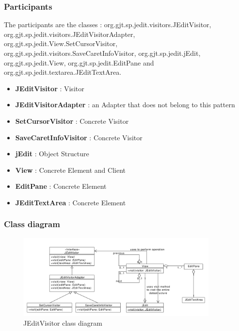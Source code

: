 \documentclass[a4paper,10pt]{article}
\begin{document}
\subsubsection{Participants}
The participants are the classes : org.gjt.sp.jedit.visitors.JEditVisitor, org.gjt.sp.jedit.visitors.JEditVisitorAdapter, org.gjt.sp.jedit.View.SetCursorVisitor, org.gjt.sp.jedit.visitors.SaveCaretInfoVisitor, org.gjt.sp.jedit.jEdit, org.gjt.sp.jedit.View, org.gjt.sp.jedit.EditPane and org.gjt.sp.jedit.textarea.JEditTextArea.
\begin{itemize}
 \item \textbf{JEditVisitor} : Visitor
 \item \textbf{JEditVisitorAdapter} : an Adapter that does not belong to this pattern
 \item \textbf{SetCursorVisitor} : Concrete Visitor
 \item \textbf{SaveCaretInfoVisitor} : Concrete Visitor
 \item \textbf{jEdit} : Object Structure
 \item \textbf{View} : Concrete Element and Client
 \item \textbf{EditPane} : Concrete Element
 \item \textbf{JEditTextArea} : Concrete Element
\end{itemize}

\subsubsection{Class diagram}
\begin{center}
\begin{figure}[h]
  \centerline{\includegraphics[width=0.9\textwidth]{visitor-jeditvisitor-class-diagram.pdf}}
  \caption{JEditVisitor class diagram}
\end{figure}
\end{center}
\end{document}
